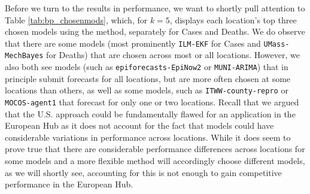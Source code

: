 Before we turn to the results in performance, we want to shortly pull attention to Table \ref{tab:bp_chosenmods}, which, for $k = 5$, displays each location's top three chosen models using the method, separately for Cases and Deaths. We do observe that there are some models (most prominently \texttt{ILM-EKF} for Cases and \texttt{UMass-MechBayes} for Deaths) that are chosen across most or all locations. However, we also both see models (such as \texttt{epiforecasts-EpiNow2} or \texttt{MUNI-ARIMA}) that in principle submit forecasts for all locations, but are more often chosen at some locations than others, as well as some models, such as \texttt{ITWW-county-repro} or \texttt{MOCOS-agent1} that forecast for only one or two locations. Recall that we argued that the U.S. approach could be fundamentally flawed for an application in the European Hub as it does not account for the fact that models could have considerable variations in performance across locations. While it does seem to prove true that there are considerable performance differences across locations for some models and a more flexible method will accordingly choose different models, as we will shortly see, accounting for this is not enough to gain competitive performance in the European Hub.\medskip\\
